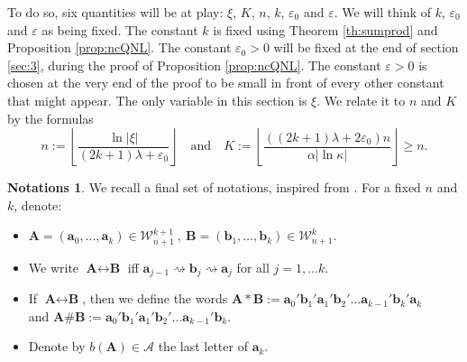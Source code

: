 \documentclass[a4paper]{article}
\theoremstyle{definition}
\newtheorem{notations}[example]{Notations}
\begin{document}
To do so, six quantities will be at play: $\xi$, $K$, $n$, $k$, $\varepsilon_0$ and $\varepsilon$. We will think of $k$, $\varepsilon_0$ and $\varepsilon$ as being fixed. The constant $k$ is fixed using Theorem \ref{th:sumprod} and Proposition \ref{prop:ncQNL}. The constant $\varepsilon_0>0$ will be fixed at the end of section \ref{sec:3}, during the proof of Proposition \ref{prop:ncQNL}. The constant $\varepsilon>0$ is chosen at the very end of the proof to be small in front of every other constant that might appear. 
The only variable in this section is $\xi$. We relate it to $n$ and $K$ by the formulas $$ n := \left\lfloor \frac{\ln |\xi|}{(2k+1) \lambda + \varepsilon_0} \right\rfloor \quad \text{and} \quad K := \left\lfloor \frac{((2k+1) \lambda + 2 \varepsilon_0)n}{\alpha |\ln \kappa|} \right\rfloor \geq n. $$


\begin{notations}
We recall a final set of notations, inspired from \cite{BD17}. For a fixed $n$ and $k$, denote:


\begin{itemize}
    \item $\textbf{A}=(\textbf{a}_0, \dots, \textbf{a}_k) \in \mathcal{W}_{n+1}^{k+1} \ , \ \textbf{B}=(\textbf{b}_1, \dots, \textbf{b}_k) \in \mathcal{W}_{n+1}^{k} $.
    \item We write $\textbf{A} \leftrightarrow \textbf{B}$ iff $\textbf{a}_{j-1} \rightsquigarrow \textbf{b}_j \rightsquigarrow \textbf{a}_j$ for all $j=1,\dots k$.
    \item If $\textbf{A} \leftrightarrow \textbf{B}$, then we define the words $\textbf{A} * \textbf{B} := \textbf{a}_0' \textbf{b}_1' \textbf{a}_1' \textbf{b}_2' \dots \textbf{a}_{k-1}' \textbf{b}_k' \textbf{a}_k$  \\ and  $\textbf{A} \# \textbf{B} :=  \textbf{a}_0' \textbf{b}_1' \textbf{a}_1' \textbf{b}_2' \dots \textbf{a}_{k-1}' \textbf{b}_k$.
    \item Denote by $b(\textbf{A}) \in \mathcal{A}$ the last letter of $\textbf{a}_k$.

\end{itemize}
\end{notations}
\end{document}
